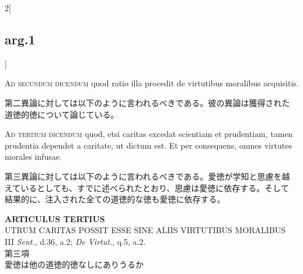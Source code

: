 \documentclass[paper=a4paper,fontsize=10pt,jafontsize=9pt,titlepage]{jlreq}
\begin{document}
\begin{paracol}{2}[\subsection{arg.1}]
\switchcolumn*[\subsection{ad.2}]

{\scshape Ad secundum dicendum} quod ratio illa procedit de
 virtutibus moralibus acquisitis.

\switchcolumn

第二異論に対しては以下のように言われるべきである。彼の異論は獲得された
道徳的徳について論じている。

\switchcolumn*[\subsection{ad.3}]

{\scshape Ad tertium dicendum} quod, etsi caritas excedat scientiam
 et prudentiam, tamen prudentia dependet a caritate, ut dictum est. Et
 per consequens, omnes virtutes morales infusae.

\switchcolumn

第三異論に対しては以下のように言われるべきである。愛徳が学知と思慮を越
えているとしても、すでに述べられたとおり、思慮は愛徳に依存する。そして
結果的に、注入された全ての道徳的な徳も愛徳に依存する。

\end{paracol}
\newpage
{}
{}
\setcounter{section}{3}
\setcounter{subsection}{0}


\begin{center}
{\Large {\bfseries ARTICULUS TERTIUS}}\\
{\large UTRUM CARITAS POSSIT ESSE SINE ALIIS VIRTUTIBUS MORALIBUS}\\
{\footnotesize III {\itshape Sent.}, d.36, a.2; {\itshape De Virtut.}, q.5, a.2.}\\
{\Large 第三項\\愛徳は他の道徳的徳なしにありうるか}
\end{center}
\end{document}
